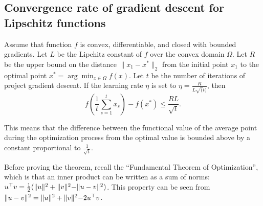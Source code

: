 \subsection{Convergence rate of gradient descent for Lipschitz functions}

\begin{theorem}

Assume that function $f$ is convex, differentiable, and closed with bounded
gradients. Let $L$ be the Lipchitz constant of $f$ over the convex domain
$\Omega$. Let $R$ be the upper bound on the distance $\lVert x_1 - x^* \rVert_2$
from the initial point $x_1$ to the optimal point $x^* = \arg\min_{x \in \Omega} f(x)$.
Let $t$ be the number of iterations of project gradient descent.
If the learning rate $\eta$ is set to $\eta=\frac{R}{L\sqrt(t)}$,
then $$f\left(\frac{1}{t}\sum_{s=1}^t x_s\right) - f\left(x^*\right) \leq
\frac{RL}{\sqrt{t}}.$$
\end{theorem}

This means that the difference between the functional value of the average
point during the optimization process from the optimal value is bounded above
by a constant proportional to $\frac{1}{\sqrt{t}}$.

Before proving the theorem, recall the ``Fundamental Theorem of Optimization'',
which is that an inner product can be written as a sum of norms: $u^\top v =
\frac{1}{2}(\lVert u \rVert^2 + \lVert v \lVert^2 - \lVert u - v \rVert^2)$.
This property can be seen from $\lVert u - v \rVert^2 = \lVert u \rVert^2 + \lVert v \lVert^2 - 2 u^\top v$.


